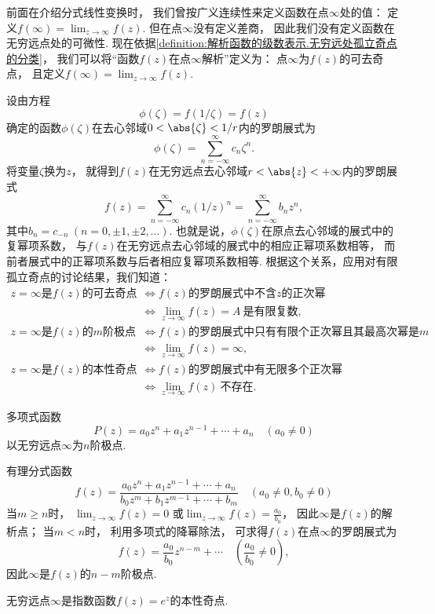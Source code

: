 前面在介绍分式线性变换时，
我们曾按广义连续性来定义函数在点\(\infty\)处的值：
定义\(f(\infty) = \lim_{z\to\infty} f(z)\).
但在点\(\infty\)没有定义差商，
因此我们没有定义函数在无穷远点处的可微性.
现在依据\cref{definition:解析函数的级数表示.无穷远处孤立奇点的分类}，
我们可以将“函数\(f(z)\)在点\(\infty\)解析”定义为：
点\(\infty\)为\(f(z)\)的可去奇点，
且定义\(f(\infty) = \lim_{z\to\infty} f(z)\).

设由方程\begin{equation*}
	\phi(\zeta) = f(1/\zeta) = f(z)
\end{equation*}
确定的函数\(\phi(\zeta)\)在去心邻域\(0<\abs{\zeta}<1/r\)内的罗朗展式为\begin{equation*}
	\phi(\zeta) = \sum_{n=-\infty}^\infty c_n \zeta^n.
\end{equation*}
将变量\(\zeta\)换为\(z\)，
就得到\(f(z)\)在无穷远点去心邻域\(r<\abs{z}<+\infty\)内的罗朗展式\begin{equation*}
	f(z) = \sum_{n=-\infty}^\infty c_n (1/z)^n
	= \sum_{n=-\infty}^\infty b_n z^n,
\end{equation*}
其中\(b_n = c_{-n}\ (n=0,\pm1,\pm2,\dotsc)\).
也就是说，\(\phi(\zeta)\)在原点去心邻域的展式中的复幂项系数，
与\(f(z)\)在无穷远点去心邻域的展式中的相应正幂项系数相等，
而前者展式中的正幂项系数与后者相应复幂项系数相等.
根据这个关系，应用对有限孤立奇点的讨论结果，我们知道：
\begin{align*}
	\text{\(z=\infty\)是\(f(z)\)的可去奇点}
	&\iff
	\text{\(f(z)\)的罗朗展式中不含\(z\)的正次幂} \\
	&\iff
	\lim_{z\to\infty} f(z) = A~\text{是有限复数}, \\
	\text{\(z=\infty\)是\(f(z)\)的\(m\)阶极点}
	&\iff
	\text{\(f(z)\)的罗朗展式中只有有限个正次幂且其最高次幂是\(m\)} \\
	&\iff
	\lim_{z\to\infty} f(z) = \infty, \\
	\text{\(z=\infty\)是\(f(z)\)的本性奇点}
	&\iff
	\text{\(f(z)\)的罗朗展式中有无限多个正次幂} \\
	&\iff
	\lim_{z\to\infty} f(z)~\text{不存在}.
\end{align*}

\begin{example}
多项式函数\begin{equation*}
	P(z) = a_0 z^n + a_1 z^{n-1} + \dotsb + a_n
	\quad(a_0\neq0)
\end{equation*}以无穷远点\(\infty\)为\(n\)阶极点.
\end{example}

\begin{example}
有理分式函数\begin{equation*}
	f(z) = \frac{a_0 z^n + a_1 z^{n-1} + \dotsb + a_n}{b_0 z^m + b_1 z^{m-1} + \dotsb + b_m}
	\quad(a_0\neq0,b_0\neq0)
\end{equation*}
当\(m \geq n\)时，
\(\lim_{z\to\infty} f(z) = 0\)
或\(\lim_{z\to\infty} f(z) = \frac{a_0}{b_0}\)，
因此\(\infty\)是\(f(z)\)的解析点；
当\(m<n\)时，
利用多项式的降幂除法，
可求得\(f(z)\)在点\(\infty\)的罗朗展式为\begin{equation*}
	f(z) = \frac{a_0}{b_0} z^{n-m} + \dotsb
	\quad(\frac{a_0}{b_0}\neq0),
\end{equation*}
因此\(\infty\)是\(f(z)\)的\(n-m\)阶极点.
\end{example}

\begin{example}
无穷远点\(\infty\)是指数函数\(f(z) = e^z\)的本性奇点.
\end{example}

